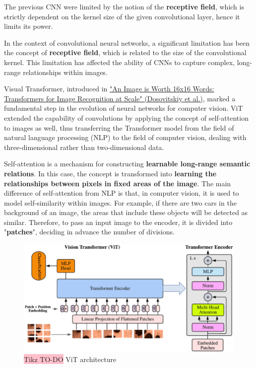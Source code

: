 The previous CNN were limited by the notion of the \textbf{receptive field}, which is strictly dependent on the kernel size of the given convolutional layer, hence it limits its power.

In the context of convolutional neural networks, a significant limitation has been the concept of \textbf{receptive field}, which is related to the size of the convolutional kernel. This limitation has affected the ability of CNNs to capture complex, long-range relationships within images.

Visual Transformer, introduced in \href{https://arxiv.org/pdf/2010.11929}{"An Image is Worth 16x16 Words: Transformers for Image Recognition at Scale" (Dosovitskiy et al.)}, marked a fundamental step in the evolution of neural networks for computer vision. ViT extended the capability of convolutions by applying the concept of self-attention to images as well, thus transferring the Transformer model from the field of natural language processing (NLP) to the field of computer vision, dealing with three-dimensional rather than two-dimensional data.

Self-attention is a mechanism for constructing \textbf{learnable long-range semantic relations}. In this case, the concept is transformed into \textbf{learning the relationships between pixels in fixed areas of the image}. The main difference of self-attention from NLP is that, in computer vision, it is used to model self-similarity within images. For example, if there are two cars in the background of an image, the areas that include these objects will be detected as similar. Therefore, to pass an input image to the encoder, it is divided into "\textbf{patches}", deciding in advance the number of divisions.

\begin{figure}[H]
    \centering
    \includegraphics[width=\linewidth]{tikz/chapter8 - Vision Transformer.png}
    \caption{{\color{red}\colorbox{pink}{Tikz TO-DO}} ViT architecture}
    \label{fig:ViT}
\end{figure}

